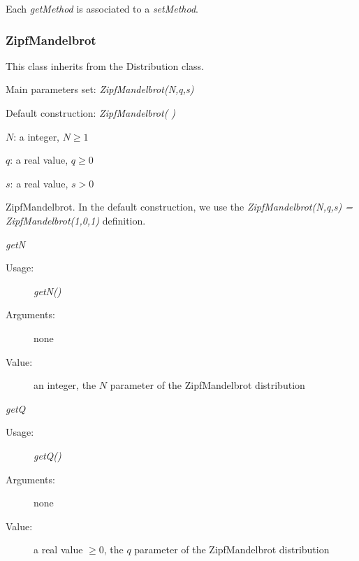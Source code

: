 Each  \textit{getMethod}  is associated to a \textit{setMethod}.



\newpage
\subsubsection{ZipfMandelbrot}

This class inherits from the Distribution class.

\begin{description}

\item[Usage:] \rule{0pt}{1em}
\begin{description}
\item Main parameters set: \textit{ZipfMandelbrot(N,q,s)}
\item Default construction: \textit{ZipfMandelbrot( )}
\end{description}

\item[Arguments:]  \rule{0pt}{1em}
\begin{description}
\item $N$: a   integer, $N \geq 1$
\item $q$: a real value, $q \geq 0$
\item $s$: a real value, $s > 0$
\end{description}

\item[Value:]  ZipfMandelbrot. In the default construction, we use the \textit{ZipfMandelbrot(N,q,s) = ZipfMandelbrot(1,0,1)} definition.

\item[Some methods:] \rule{0pt}{1em}
\begin{description}

\item \textit{getN}
\begin{description}
\item[Usage:] \textit{getN()}
\item[Arguments:] none
\item[Value:]  an integer,  the $N$ parameter of the ZipfMandelbrot distribution
\end{description}
\bigskip

\item \textit{getQ}
\begin{description}
\item[Usage:] \textit{getQ()}
\item[Arguments:] none
\item[Value:]  a real value $\geq 0$,  the $q$ parameter of the ZipfMandelbrot distribution
\end{description}
\bigskip


\end{description}
\end{description}
